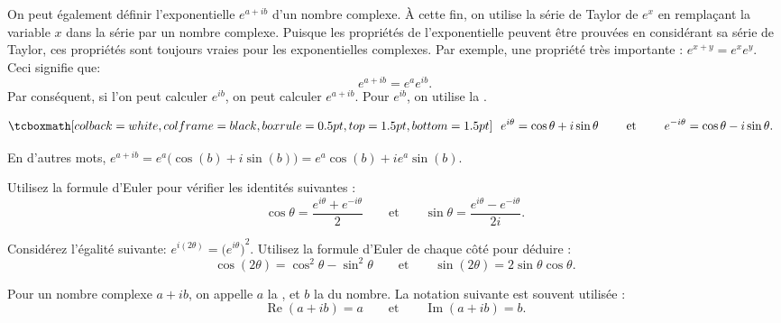 \pagebreak[2]
On peut également définir l'exponentielle $e^{a+ib}$ d'un nombre complexe. 
À cette fin, on utilise la série de Taylor de $e^x$ en remplaçant la variable $x$ dans la série par un nombre complexe. 
Puisque les propriétés de l'exponentielle peuvent être prouvées en considérant sa série de Taylor, ces propriétés sont toujours vraies pour les exponentielles complexes.  
Par exemple, une propriété très importante :   $e^{x+y} = e^x e^y$. 
Ceci signifie que: 
\begin{equation*}
	e^{a+ib} = e^a e^{ib}.
\end{equation*}
Par conséquent, si l'on peut  calculer $e^{ib}$, on peut calculer $e^{a+ib}$.  
Pour $e^{ib}$, on utilise la  \emph{}.

\begin{theorem} \label{eulersformula}
	\begin{equation*}
	\mybxbg{~~
		e^{i \theta} = \cos \theta + i \sin \theta
		\qquad \text{ et } \qquad
		e^{- i \theta} = \cos \theta - i \sin \theta .
	~~}
	\end{equation*}
\end{theorem}

En d'autres mots, $e^{a+ib} = e^a \bigl( \cos(b) + i \sin(b) \bigr) = e^a \cos(b) + i e^a \sin(b)$.

\begin{exercise}
	Utilisez la formule d'Euler pour vérifier les identités suivantes : 
	\begin{equation*}
		\cos \theta = \frac{e^{i \theta} + e^{-i \theta}}{2}
		\qquad \text{et} \qquad
		\sin \theta = \frac{e^{i \theta} - e^{-i \theta}}{2i}.
	\end{equation*}
\end{exercise}

\begin{exercise}
	Considérez l'égalité suivante: $e^{i(2\theta)} = {\bigl(e^{i \theta} \bigr)}^2$.  
	Utilisez la formule d'Euler de chaque côté pour déduire :
	\begin{equation*}
		\cos (2\theta) = \cos^2 \theta - \sin^2 \theta
		\qquad \text{et} \qquad
		\sin (2\theta) = 2 \sin \theta \cos \theta .
	\end{equation*}
\end{exercise}

Pour un nombre complexe $a+ib$, on appelle $a$ la \emph{},  
et $b$ la \emph{} du nombre.
La notation suivante est souvent utilisée : 
\begin{equation*}
	\operatorname{Re}(a+ib) = a
	\qquad \text{et} \qquad
	\operatorname{Im}(a+ib) = b.
\end{equation*}



